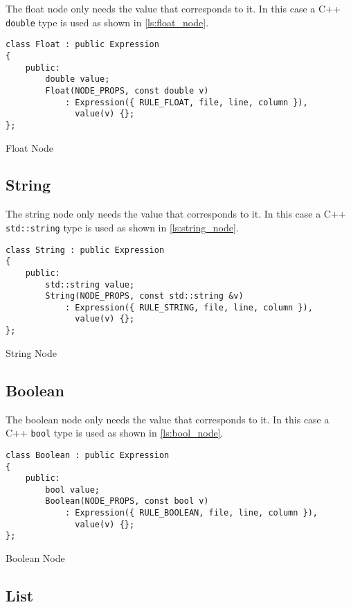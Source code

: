 The float node only needs the value that corresponds to it. In this case a C++ \texttt{double} type is used as shown in
\autoref{ls:float_node}.

\begin{listing}[H]
\begin{verbatim}
class Float : public Expression
{
    public:
        double value;
        Float(NODE_PROPS, const double v)
            : Expression({ RULE_FLOAT, file, line, column }),
              value(v) {};
};
\end{verbatim}
\caption{Float Node}
\label{ls:float_node}
\end{listing}

\subsection{String}

The string node only needs the value that corresponds to it. In this case a C++ \texttt{std::string} type is used as shown in
\autoref{ls:string_node}.

\begin{listing}[H]
\begin{verbatim}
class String : public Expression
{
    public:
        std::string value;
        String(NODE_PROPS, const std::string &v)
            : Expression({ RULE_STRING, file, line, column }),
              value(v) {};
};
\end{verbatim}
\caption{String Node}
\label{ls:string_node}
\end{listing}

\subsection{Boolean}

The boolean node only needs the value that corresponds to it. In this case a C++ \texttt{bool} type is used as shown in
\autoref{ls:bool_node}.

\begin{listing}[H]
\begin{verbatim}
class Boolean : public Expression
{
    public:
        bool value;
        Boolean(NODE_PROPS, const bool v)
            : Expression({ RULE_BOOLEAN, file, line, column }),
              value(v) {};
};
\end{verbatim}
\caption{Boolean Node}
\label{ls:bool_node}
\end{listing}

\subsection{List}

